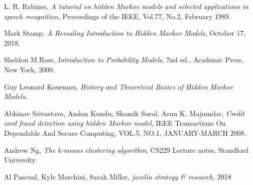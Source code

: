 \begin{thebibliography}{50}
\bibitem{[1]} L. R. Rabiner, {\it A tutorial on hidden Markov models and selected applications in speech recognition}, Proceedings of the IEEE, Vol.77, No.2, February 1989.

\bibitem{[2]} Mark Stamp, {\it A Revealing Introduction to Hidden Markov Models}, October 17, 2018.

\bibitem{[3]} Sheldon M.Ross, {\it Introduction to Probability Models}, 7nd ed., Academic Press, New York, 2000.

\bibitem{[4]} Guy Leonard Kouemou, {\it History and Theoretical Basics of Hidden Markov Models}.

\bibitem{[5]} Abhinav Srivastava, Amlan Kundu, Shamik Sural, Arun K. Majumdar, {\it Credit card fraud detection using hidden Markov model}, IEEE Transactions On Dependable And Secure Computing, VOL.5, NO.1, JANUARY-MARCH 2008.

\bibitem{[6]} Andrew Ng, {\it The k-means clustering algorithm}, CS229 Lecture notes, Standford University.

\bibitem{[7]} Al Pascual, Kyle Marchini, Sarah Miller, {\it javelin strategy \& research}, 2018

\end{thebibliography} 
